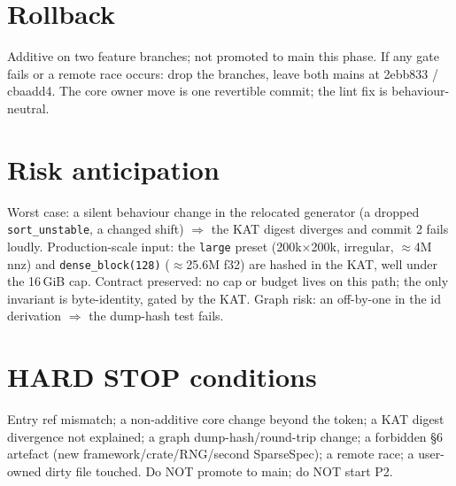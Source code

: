\documentclass[11pt]{article}
\begin{document}
\section*{Rollback}
Additive on two feature branches; not promoted to main this phase. If any gate fails or a remote race
occurs: drop the branches, leave both mains at 2ebb833 / cbaadd4. The core owner move is one revertible
commit; the lint fix is behaviour-neutral.

\section*{Risk anticipation}
Worst case: a silent behaviour change in the relocated generator (a dropped \texttt{sort\_unstable}, a
changed shift) $\Rightarrow$ the KAT digest diverges and commit 2 fails loudly. Production-scale input: the
\texttt{large} preset (200k$\times$200k, irregular, $\approx$4M nnz) and \texttt{dense\_block(128)}
($\approx$25.6M f32) are hashed in the KAT, well under the 16\,GiB cap. Contract preserved: no cap or
budget lives on this path; the only invariant is byte-identity, gated by the KAT. Graph risk: an off-by-one
in the id derivation $\Rightarrow$ the dump-hash test fails.

\section*{HARD STOP conditions}
Entry ref mismatch; a non-additive core change beyond the token; a KAT digest divergence not explained;
a graph dump-hash/round-trip change; a forbidden \S6 artefact (new framework/crate/RNG/second SparseSpec);
a remote race; a user-owned dirty file touched. Do NOT promote to main; do NOT start P2.
\end{document}
